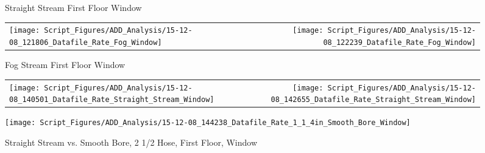 \documentclass[12pt,oneside]{book}
\begin{document}
\begin{figure}[ht]
\centering
{}
\caption{Straight Stream First Floor Window}
\label{fig:Straight Stream First Floor Window}
\end{figure}

\clearpage

\begin{figure}[ht]
\begin{tabular*}{\textwidth}{lr}
\texttt{[image: Script\_Figures/ADD\_Analysis/15-12-08\_121806\_Datafile\_Rate\_Fog\_Window]} &
\texttt{[image: Script\_Figures/ADD\_Analysis/15-12-08\_122239\_Datafile\_Rate\_Fog\_Window]} \\
\end{tabular*}
\caption{Fog Stream First Floor Window}
\label{fig:Fog Stream First Floor Window}
\end{figure}

\clearpage

\begin{figure}[ht]
\begin{tabular*}{\textwidth}{lr}
\texttt{[image: Script\_Figures/ADD\_Analysis/15-12-08\_140501\_Datafile\_Rate\_Straight\_Stream\_Window]} &
\texttt{[image: Script\_Figures/ADD\_Analysis/15-12-08\_142655\_Datafile\_Rate\_Straight\_Stream\_Window]} \\
\end{tabular*}
\centering
\texttt{[image: Script\_Figures/ADD\_Analysis/15-12-08\_144238\_Datafile\_Rate\_1\_1\_4in\_Smooth\_Bore\_Window]}
\caption{Straight Stream vs. Smooth Bore, 2 1/2 Hose, First Floor, Window}
\label{fig:Straight Stream vs. Smooth Bore, 2 1/2 Hose, First Floor Window}
\end{figure}
\end{document}
